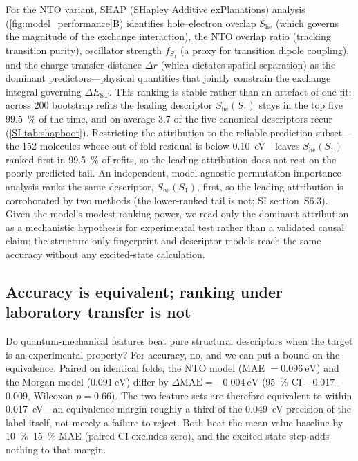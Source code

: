 For the NTO variant, SHAP (SHapley Additive exPlanations) analysis
(\cref{fig:model_performance}B) identifies
hole--electron overlap $S_\text{he}$ (which governs the magnitude of the exchange interaction), the NTO overlap ratio (tracking transition purity), oscillator strength
$f_{S_1}$ (a proxy for transition dipole coupling), and the charge-transfer distance $\Delta r$ (which dictates spatial separation) as the dominant
predictors---physical quantities that jointly constrain the exchange integral governing
$\Delta E_\text{ST}$. This ranking is stable rather than an artefact of one fit:
across \num{200} bootstrap refits the leading descriptor $S_\text{he}(S_1)$ stays
in the top five \qty{99.5}{\percent} of the time, and on average \num{3.7} of the
five canonical descriptors recur (\cref{SI-tab:shapboot}). Restricting the attribution to
the reliable-prediction subset---the \num{152} molecules whose out-of-fold residual is
below \qty{0.10}{\electronvolt}---leaves $S_\text{he}(S_1)$ ranked first in
\qty{99.5}{\percent} of refits, so the leading attribution does not rest on the
poorly-predicted tail. An independent, model-agnostic permutation-importance analysis ranks the same
descriptor, $S_\text{he}(S_1)$, first, so the leading attribution is corroborated by
two methods (the lower-ranked tail is not; SI section~S6.3). Given the model's modest
ranking power, we read only the dominant attribution as a mechanistic hypothesis for
experimental test rather than a validated causal claim; the structure-only
fingerprint and descriptor models reach the same accuracy without any excited-state
calculation.

\subsection{Accuracy is equivalent; ranking under laboratory transfer is not}\label{subsec:nto_null}

Do quantum-mechanical features beat pure structural descriptors when the target is an
experimental property? For accuracy, no, and we can put a bound on the equivalence.
Paired on identical folds, the NTO model (MAE $= \qty{0.096}{\electronvolt}$) and the
Morgan model ($\qty{0.091}{\electronvolt}$) differ by
$\Delta\text{MAE} = \qty{-0.004}{\electronvolt}$ (\qty{95}{\percent} CI
\numrange{-0.017}{0.009}, Wilcoxon $p = 0.66$). The two feature sets are therefore
equivalent to within \qty{0.017}{\electronvolt}---an equivalence margin roughly a third
of the \qty{0.049}{\electronvolt} precision of the label itself, not merely a failure to
reject. Both beat the mean-value baseline by \qtyrange{10}{15}{\percent} MAE (paired CI
excludes zero), and the excited-state step adds nothing to that margin.

